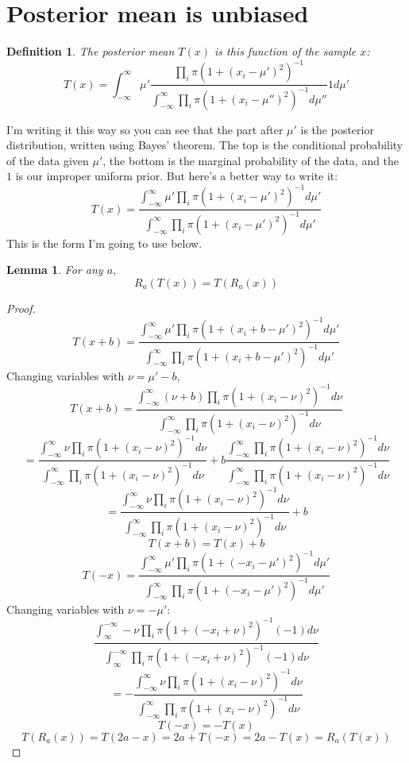 \documentclass{article}
\newtheorem{lemma}{Lemma}
\newtheorem{definition}{Definition}
\begin{document}
\section{Posterior mean is unbiased}
\begin{definition}The posterior mean $T(x)$ is this function of the sample $x$:
$$T(x) = \int_{-\infty}^{\infty} \mu' \frac{\prod_i \pi (1 + (x_i-\mu')^2)^{-1}}{\int_{-\infty}^\infty \prod_i \pi (1 + (x_i-\mu'')^2)^{-1} d\mu''} 1 d\mu'$$
\end{definition}
I'm writing it this way so you can see that the part after $\mu'$ is the posterior distribution, written using Bayes' theorem. The top is the conditional probability of the data given $\mu'$, the bottom is the marginal probability of the data, and the $1$ is our improper uniform prior. But here's a better way to write it:
$$T(x) = \frac{\int_{-\infty}^{\infty} \mu' \prod_i \pi (1 + (x_i-\mu')^2)^{-1}d\mu'}{\int_{-\infty}^\infty \prod_i \pi (1 + (x_i-\mu')^2)^{-1} d\mu'}$$
This is the form I'm going to use below.
\begin{lemma}For any $a$, $$R_a(T(x)) = T(R_a(x))$$\end{lemma}
\begin{proof}
$$T(x+b) = \frac{\int_{-\infty}^{\infty} \mu' \prod_i \pi (1 + (x_i+b-\mu')^2)^{-1}d\mu'}{\int_{-\infty}^\infty \prod_i \pi (1 + (x_i+b-\mu')^2)^{-1} d\mu'}$$
Changing variables with $\nu=\mu'-b$,
$$T(x+b) = \frac{\int_{-\infty}^{\infty} (\nu+b) \prod_i \pi (1 + (x_i-\nu)^2)^{-1}d\nu}{\int_{-\infty}^\infty \prod_i \pi (1 + (x_i-\nu)^2)^{-1} d\nu}$$
$$=\frac{\int_{-\infty}^{\infty} \nu \prod_i \pi (1 + (x_i-\nu)^2)^{-1}d\nu}{\int_{-\infty}^\infty \prod_i \pi (1 + (x_i-\nu)^2)^{-1} d\nu} + b \frac{\int_{-\infty}^{\infty} \prod_i \pi (1 + (x_i-\nu)^2)^{-1}d\nu}{\int_{-\infty}^\infty \prod_i \pi (1 + (x_i-\nu)^2)^{-1} d\nu}$$
$$=\frac{\int_{-\infty}^{\infty} \nu \prod_i \pi (1 + (x_i-\nu)^2)^{-1}d\nu}{\int_{-\infty}^\infty \prod_i \pi (1 + (x_i-\nu)^2)^{-1} d\nu} + b $$
$$T(x+b) = T(x)+b$$
$$T(-x) = \frac{\int_{-\infty}^{\infty} \mu' \prod_i \pi (1 + (-x_i-\mu')^2)^{-1}d\mu'}{\int_{-\infty}^\infty \prod_i \pi (1 + (-x_i-\mu')^2)^{-1} d\mu'}$$
Changing variables with $\nu=-\mu'$:
$$\frac{\int_{\infty}^{-\infty} -\nu \prod_i \pi (1 + (-x_i+\nu)^2)^{-1}(-1)d\nu}{\int_{\infty}^{-\infty} \prod_i \pi (1 + (-x_i+\nu)^2)^{-1} (-1) d\nu}$$
$$=-\frac{\int_{-\infty}^{\infty} \nu \prod_i \pi (1 + (x_i-\nu)^2)^{-1}d\nu}{\int_{-\infty}^\infty \prod_i \pi (1 + (x_i-\nu)^2)^{-1} d\nu}$$
$$T(-x)=-T(x)$$
$$T(R_a(x)) = T(2a-x) = 2a + T(-x) = 2a - T(x) = R_a(T(x))$$
\end{proof}
\end{document}
